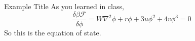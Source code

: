 \begin{answer}{3.1415}{Example Title}
As you learned in class, 
$$ \frac{\delta \beta \mathcal{F}}{\delta \phi} = W\nabla^2 \phi + r\phi + 3u\phi^2 + 4v\phi^3 = 0 $$
So this is the equation of state.
\end{answer}